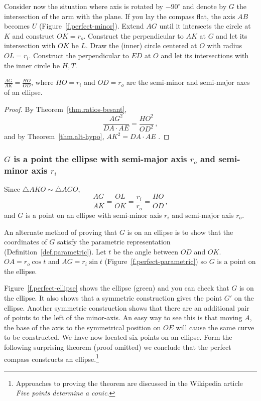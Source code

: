 \documentclass[11pt,a4paper]{report}
\begin{document}
Consider now the situation where axis is rotated by $-90^\circ$ and denote by $G$ the intersection of the arm with the plane. If you lay the compass flat, the axis $AB$ becomes $U$ (Figure~\ref{f.perfect-minor}). Extend $AG$ until it intersects the circle at $K$ and construct $OK=r_o$. Construct the perpendicular to $AK$ at $G$ and let its intersection with $OK$ be $L$. Draw the (inner) circle centered at $O$ with radius $OL=r_i$. Construct the perpendicular to $ED$ at $O$ and let its intersections with the inner circle be $H,T$.

\begin{theorem}
$\displaystyle\frac{AG}{AK}=\frac{HO}{OD}$, where $HO=r_i$ and $OD=r_o$ are the semi-minor and semi-major axes of an ellipse.
\end{theorem}
\begin{proof}
By Theorem~\ref{thm.ratios-besant},
\[
\frac{AG^2}{DA\cdot AE} = \frac{HO^2}{OD^2}\,,
\]
and by Theorem~\ref{thm.alt-hypo}, $AK^2=DA\cdot AE$ .\fqed
\end{proof}

\subsubsection*{$G$ is a point the ellipse with semi-major axis $r_o$ and semi-minor axis $r_i$}

Since $\triangle AKO \sim \triangle AGO$,
\[
\frac{AG}{AK}=\frac{OL}{OK}=\frac{r_i}{r_o}=\frac{HO}{OD}\,,
\]
and $G$ is a point on an ellipse with semi-minor axis $r_i$ and semi-major axis $r_o$.


An alternate method of proving that $G$ is on an ellipse is to show that the coordinates of $G$ satisfy the parametric representation (Definition~\ref{def.parametric}). Let $t$ be the angle between $OD$ and $OK$. $OA=r_o\cos t$ and $AG=r_i\sin t$ (Figure~\ref{f.perfect-parametric}) so $G$ is a point on the ellipse. 

Figure~\ref{f.perfect-ellipse} shows the ellipse (green) and you can check that $G$ is on the ellipse. It also shows that a symmetric construction gives the point $G'$ on the ellipse. Another symmetric construction shows that there are an additional pair of points to the left of the minor-axis.  An easy way to see this is that moving $A$, the base of the axis to the symmetrical position on $OE$ will cause the same curve to be constructed. We have now located six points on an ellipse. Form the following surprising theorem (proof omitted) we conclude that the perfect compass constructs an ellipse.\footnote{Approaches to proving the theorem are discussed in the Wikipedia article \emph{Five points determine a conic}.}
\end{document}
